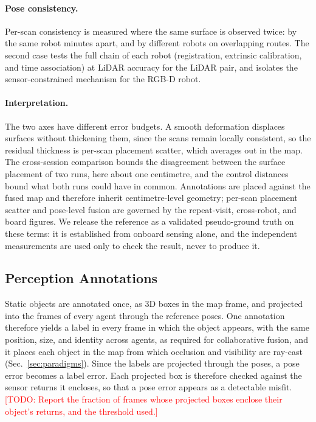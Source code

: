 \documentclass[conference]{IEEEtran}
\newcommand{\todo}[1]{\textcolor{red}{[TODO: #1]}}
\begin{document}
\paragraph{Pose consistency.} Per-scan consistency is measured where
the same surface is observed twice: by the same robot minutes apart,
and by different robots on overlapping routes. The second case tests
the full chain of each robot (registration, extrinsic calibration,
and time association) at LiDAR accuracy for the LiDAR pair, and
isolates the sensor-constrained mechanism for the RGB-D robot.

\paragraph{Interpretation.} The two axes have different error
budgets. A smooth deformation displaces surfaces without thickening
them, since the scans remain locally consistent, so the residual
thickness is per-scan placement scatter, which averages out in the
map. The cross-session comparison bounds the disagreement between
the surface placement of two runs, here about one centimetre, and
the control distances bound what both runs could have in common.
Annotations are placed against the fused map and therefore inherit
centimetre-level geometry; per-scan placement scatter and pose-level
fusion are governed by the repeat-visit, cross-robot, and board
figures. We release the reference as a validated pseudo-ground truth
on these terms: it is established from onboard sensing alone, and the
independent measurements are used only to check the result, never to
produce it.





\subsection{Perception Annotations}
\label{sec:annotations}
Static objects are annotated once, as 3D boxes in the map frame, and
projected into the frames of every agent through the reference
poses. One annotation therefore yields a label in every frame in
which the object appears, with the same position, size, and identity
across agents, as required for collaborative fusion, and it places
each object in the map from which occlusion and visibility are
ray-cast (Sec.~\ref{sec:paradigms}). Since the labels are projected
through the poses, a pose error becomes a label error. Each projected
box is therefore checked against the sensor returns it encloses, so
that a pose error appears as a detectable misfit. \todo{Report the
fraction of frames whose projected boxes enclose their object's
returns, and the threshold used.}
\end{document}
